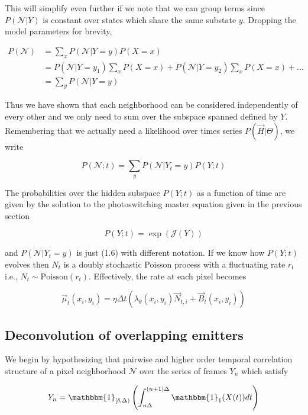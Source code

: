 \documentclass{ucetd}
\begin{document}
This will simplify even further if we note that we can group terms since $P(\mathcal{N}|Y)$ is constant over states which share the same substate $y$. Dropping the model parameters for brevity,

\begin{align*}
P(\mathcal{N}) &= \sum_{x}P(\mathcal{N}|Y=y)P(X=x)\\
&= P(\mathcal{N}|Y=y_{1})\sum_{x}P(X=x) +  P(\mathcal{N}|Y=y_{2})\sum_{x}P(X=x) + ... \\
&=  \sum_{y}P(\mathcal{N}|Y=y)
\end{align*}

Thus we have shown that each neighborhood can be considered independently of every other and we only need to sum over the subspace spanned defined by $Y$. Remembering that we actually need a likelihood over times series  $P(\vec{H}|\Theta)$, we write

\begin{equation*}
P(\mathcal{N}; t) = \sum_{y}P(\mathcal{N}|Y_{t}=y)P(Y;t)
\end{equation*}

The probabilities over the hidden subspace $P(Y;t)$ as a function of time are given by the solution to the photoswitching master equation given in the previous section

\begin{equation*}
P(Y; t) = \exp(\mathcal{J}(Y))
\end{equation*}

and $P(\mathcal{N}|Y_{t}=y)$ is just (1.6) with different notation. If we know how $P(Y;t)$ evolves then $N_{t}$ is a doubly stochastic Poisson process with a fluctuating rate $r_{t}$ i.e., $N_{t} \sim \mathrm{Poisson}(r_{t})$. Effectively, the rate at each pixel becomes

\begin{equation*}
\vec{\mu}_{t}(x_{i},y_{i}) = \eta\Delta t\left(\lambda_{\theta}(x_{i},y_{i})\vec{N}_{t,i} + \vec{B}_{t}(x_{i},y_{i})\right)
\end{equation*}

\subsection{Deconvolution of overlapping emitters}

We begin by hypothesizing that pairwise and higher order temporal correlation structure of a pixel neighborhood $\mathcal{N}$ over the series of frames $Y_{n}$ which satisfy 

\begin{equation*}
Y_{n} = \mathbbm{1}_{[\delta,\Delta)}\left(\int_{n\Delta}^{(n+1)\Delta} \mathbbm{1}_{1} (X(t)) dt\right)
\end{equation*}
\end{document}
